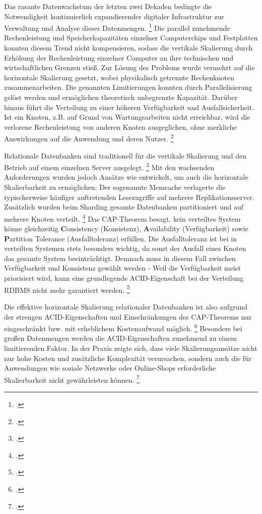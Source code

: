 Das rasante Datenwachstum der letzten zwei Dekaden bedingte die Notwendigkeit kontinuierlich expandierender digitaler Infrastruktur zur Verwaltung und Analyse dieser Datenmengen. \footcite{petrocAmountDataCreated2024} Die parallel zunehmende Rechenleistung und Speicherkapazitäten einzelner Computerchips und Festplatten konnten diesem Trend nicht kompensieren, sodass die vertikale Skalierung durch Erhöhung der Rechenleistung einzelner Computer an ihre technischen und wirtschaftlichen Grenzen stieß. Zur Lösung des Problems wurde vermehrt auf die horizontale Skalierung gesetzt, wobei physikalisch getrennte Rechenknoten zusammenarbeiten. Die genannten Limitierungen konnten durch Parallelisierung gelöst werden und ermöglichen theoretisch unbegrenzte Kapazität. Darüber hinaus führt die Verteilung zu einer höheren Verfügbarkeit und Ausfallsicherheit. Ist ein Knoten, z.B. auf Grund von Wartungsarbeiten nicht erreichbar, wird die verlorene Rechenleistung von anderen Knoten ausgeglichen, ohne merkliche Auswirkungen auf die Anwendung und deren Nutzer. \footcite[S. 120]{uyangaComparativeStudyNoSQL2021}

Relationale Datenbanken sind traditionell für die vertikale Skalierung und den Betrieb auf einem einzelnen Server ausgelegt. \footcite{sahatqijaComparisonRelationalNOSQL2018}
Mit den wachsenden Anforderungen wurden jedoch Ansätze wie entwickelt, um auch die horizontale Skalierbarkeit zu ermöglichen: Der sogenannte Memcache verlagerte die typischerweise häufiger auftretenden Lesezugriffe auf mehrere Replikationsserver. Zusätzlich wurden beim Sharding gesamte Datenbanken partitioniert und auf mehrere Knoten verteilt. \footcite[S. 16]{dertingerNoSQLDatenbankenUndNichtrelationale2025} Das CAP-Theorem besagt, kein verteiltes System könne gleichzeitig \textbf{C}onsistency (Konsistenz), \textbf{A}vailability (Verfügbarkeit) sowie \textbf{P}artition Tolerance (Ausfalltoleranz) erfüllen. Die Ausfalltoleranz ist bei in verteilten Systemen stets besonders wichtig, da sonst der Ausfall eines Knoten das gesamte System beeinträchtigt. Demnach muss in diesem Fall zwischen Verfügbarkeit und Konsistenz gewählt werden - Weil die Verfügbarkeit meist priorisiert wird, kann eine grundlegende ACID-Eigenschaft bei der Verteilung RDBMS nicht mehr garantiert werden. \footcite[S. 33 ff.]{meierWerkzeugeDigitalenWirtschaft2018}

Die effektive horizontale Skalierung relationaler Datenbanken ist also aufgrund der strengen ACID-Eigenschaften und Einschränkungen des CAP-Theorems nur eingeschränkt bzw. mit erheblichem Kostenaufwand möglich. \footcite[S. 1]{schreinerWhenRelationalBasedApplications2019} Besonders bei großen Datenmengen werden die ACID-Eigenschaften zunehmend zu einem limitierenden Faktor. In der Praxis zeigte sich, dass viele Skalierungsansätze nicht nur hohe Kosten und zusätzliche Komplexität verursachen, sondern auch die für Anwendungen wie soziale Netzwerke oder Online-Shops erforderliche Skalierbarkeit nicht gewährleisten können. \footcite[S. 41-43]{harrisonNextGenerationDatabases2015}

